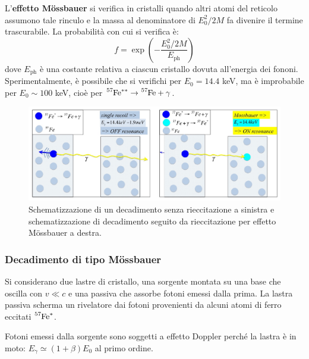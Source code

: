 \documentclass[10pt, a4paper]{scrartcl}
\numberwithin{equation}{subsection}
\theoremstyle{style1}
\begin{document}
L'\textbf{effetto M\"ossbauer} si verifica in cristalli quando altri atomi del reticolo assumono tale rinculo e la massa al denominatore di $E_0^2 / 2M$ fa divenire il termine trascurabile. La probabilit\`a con cui si verifica \`e:
\[
f = \exp\left(- \frac{E_0^2 / 2M}{E_\text{ph}}\right) 
\] 
dove $E_\text{ph}$ \`e una costante relativa a ciascun cristallo dovuta all'energia dei fononi. Sperimentalmente, \`e possibile che si verifichi per $E_0 = 14.4 $ keV, ma \`e improbabile per $E_0 \sim 100$ keV, cio\`e per $\ce{^{57}Fe^{**}}\to \ce{^{57}Fe}+ \gamma  $.
\begin{figure}[h!]
	\centering
	\includegraphics[width=1\columnwidth]{efmoss.png}
	\caption{Schematizzazione di un decadimento senza rieccitazione a sinistra e schematizzazione di decadimento seguito da rieccitazione per effetto M\"ossbauer a destra.}
\end{figure}
\subsubsection{Decadimento di tipo M\"ossbauer}
Si considerano due lastre di cristallo, una sorgente montata su una base che oscilla con $v \ll c$ e una passiva che assorbe fotoni emessi dalla prima. La lastra passiva scherma un rivelatore dai fotoni provenienti da alcuni atomi di ferro eccitati $\ce{^{57}Fe^*}$.

Fotoni emessi dalla sorgente sono soggetti a effetto Doppler perch\'e la lastra \`e in moto: $E_\gamma \simeq (1+\beta ) E_0$ al primo ordine.
\end{document}

